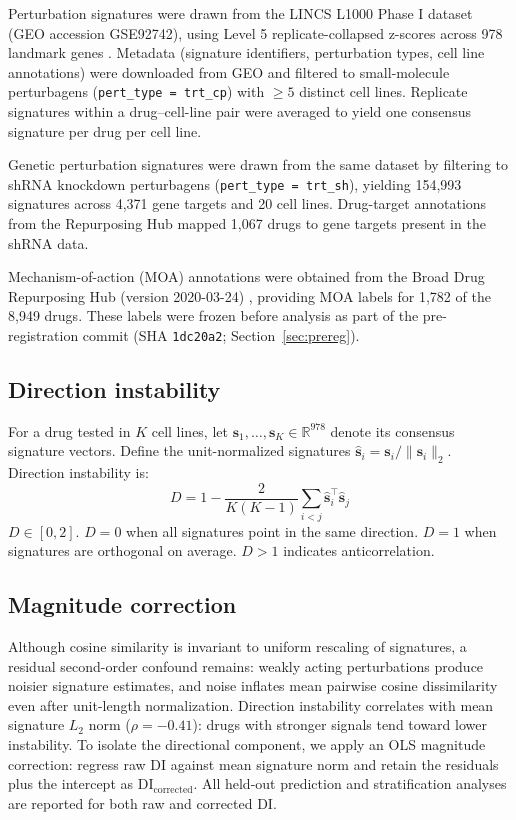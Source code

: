 \documentclass[11pt]{article}
\begin{document}
Perturbation signatures were drawn from the LINCS L1000 Phase I dataset
(GEO accession GSE92742), using Level 5 replicate-collapsed z-scores across
978 landmark genes \citep{subramanian2017next}. Metadata (signature
identifiers, perturbation types, cell line annotations) were downloaded from
GEO and filtered to small-molecule perturbagens (\texttt{pert\_type =
trt\_cp}) with $\geq5$ distinct cell lines. Replicate signatures within a
drug--cell-line pair were averaged to yield one consensus signature per
drug per cell line.

Genetic perturbation signatures were drawn from the same dataset by
filtering to shRNA knockdown perturbagens (\texttt{pert\_type = trt\_sh}),
yielding 154{,}993 signatures across 4{,}371 gene targets and 20 cell lines.
Drug-target annotations from the Repurposing Hub mapped 1{,}067 drugs to
gene targets present in the shRNA data.

Mechanism-of-action (MOA) annotations were obtained from the Broad Drug
Repurposing Hub (version 2020-03-24) \citep{corsello2017drug}, providing
MOA labels for 1{,}782 of the 8{,}949 drugs. These labels were frozen
before analysis as part of the pre-registration commit
(SHA \texttt{1dc20a2}; Section~\ref{sec:prereg}).

\subsection{Direction instability}

For a drug tested in $K$ cell lines, let $\mathbf{s}_1, \ldots,
\mathbf{s}_K \in \mathbb{R}^{978}$ denote its consensus signature vectors.
Define the unit-normalized signatures $\hat{\mathbf{s}}_i =
\mathbf{s}_i / \|\mathbf{s}_i\|_2$. Direction instability is:
\begin{equation}
  D = 1 - \frac{2}{K(K-1)} \sum_{i < j}
    \hat{\mathbf{s}}_i^\top \hat{\mathbf{s}}_j
  \label{eq:direction_instability}
\end{equation}
$D \in [0, 2]$. $D = 0$ when all signatures point in the same direction.
$D = 1$ when signatures are orthogonal on average. $D > 1$ indicates
anticorrelation.

\subsection{Magnitude correction}

Although cosine similarity is invariant to uniform rescaling of
signatures, a residual second-order confound remains: weakly acting
perturbations produce noisier signature estimates, and noise inflates
mean pairwise cosine dissimilarity even after unit-length normalization.
Direction instability correlates with mean signature $L_2$ norm
($\rho = -0.41$): drugs with stronger signals tend toward lower
instability.  To isolate the directional component, we apply an OLS
magnitude correction: regress raw DI against mean signature norm and
retain the residuals plus the intercept as
$\text{DI}_{\text{corrected}}$.  All held-out prediction and
stratification analyses are reported for both raw and corrected DI.
\end{document}
